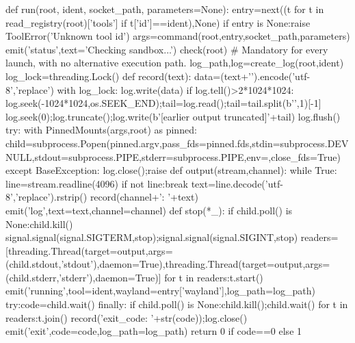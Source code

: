 def run(root, ident, socket_path, parameters=None):
    entry=next((t for t in read_registry(root)['tools'] if t['id']==ident),None)
    if entry is None:raise ToolError('Unknown tool id')
    args=command(root,entry,socket_path,parameters)
    emit('status',text='Checking sandbox...')
    check(root) # Mandatory for every launch, with no alternative execution path.
    log_path,log=create_log(root,ident)
    log_lock=threading.Lock()
    def record(text):
        data=(text+'\n').encode('utf-8','replace')
        with log_lock:
            log.write(data)
            if log.tell()>2*1024*1024:
                log.seek(-1024*1024,os.SEEK_END);tail=log.read();tail=tail.split(b'\n',1)[-1]
                log.seek(0);log.truncate();log.write(b'[earlier output truncated]\n'+tail)
            log.flush()
    try:
        with PinnedMounts(args,root) as pinned:
            child=subprocess.Popen(pinned.argv,pass_fds=pinned.fds,stdin=subprocess.DEVNULL,stdout=subprocess.PIPE,stderr=subprocess.PIPE,env={},close_fds=True)
    except BaseException:
        log.close();raise
    def output(stream,channel):
        while True:
            line=stream.readline(4096)
            if not line:break
            text=line.decode('utf-8','replace').rstrip()
            record(channel+': '+text)
            emit('log',text=text,channel=channel)
    def stop(*_):
        if child.poll() is None:child.kill()
    signal.signal(signal.SIGTERM,stop);signal.signal(signal.SIGINT,stop)
    readers=[threading.Thread(target=output,args=(child.stdout,'stdout'),daemon=True),threading.Thread(target=output,args=(child.stderr,'stderr'),daemon=True)]
    for t in readers:t.start()
    emit('running',tool=ident,wayland=entry['wayland'],log_path=log_path)
    try:code=child.wait()
    finally:
        if child.poll() is None:child.kill();child.wait()
    for t in readers:t.join()
    record('exit_code: '+str(code));log.close()
    emit('exit',code=code,log_path=log_path)
    return 0 if code==0 else 1

